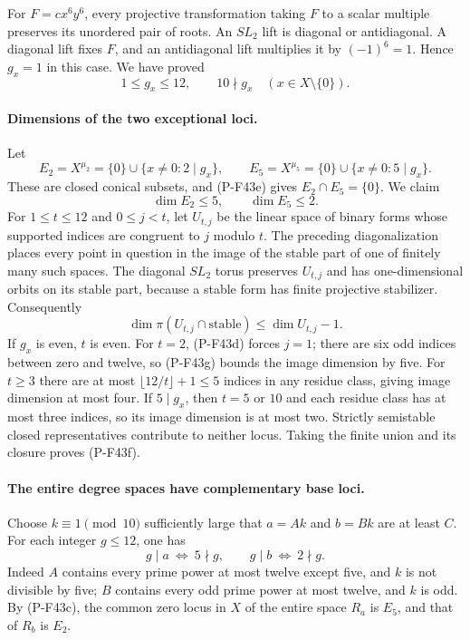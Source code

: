 \documentclass[11pt,a4paper]{article}
\begin{document}
For $F=cx^6y^6$, every projective transformation taking $F$
to a scalar multiple preserves its unordered pair of roots.
An $SL_2$ lift is diagonal or antidiagonal. A diagonal lift
fixes $F$, and an antidiagonal lift multiplies it by
$(-1)^6=1$. Hence $g_x=1$ in this case. We have proved
\[
              1\le g_x\le12,\qquad 10\nmid g_x
                    \quad(x\in X\setminus\{0\}).
 \tag{P-F43e}
\]

\paragraph{Dimensions of the two exceptional loci.}
Let
\[
 E_2=X^{\mu_2}=\{0\}\cup\{x\ne0:2\mid g_x\},
 \qquad
 E_5=X^{\mu_5}=\{0\}\cup\{x\ne0:5\mid g_x\}.
\]
These are closed conical subsets, and (P-F43e) gives
$E_2\cap E_5=\{0\}$. We claim
\[
                       \dim E_2\le5,\qquad\dim E_5\le2.
 \tag{P-F43f}
\]
For $1\le t\le12$ and $0\le j<t$, let $U_{t,j}$ be the
linear space of binary forms whose supported indices are
congruent to $j$ modulo $t$. The preceding diagonalization
places every point in question in the image of the stable
part of one of finitely many such spaces. The diagonal
$SL_2$ torus preserves $U_{t,j}$ and has one-dimensional
orbits on its stable part, because a stable form has finite
projective stabilizer. Consequently
\[
 \dim\pi(U_{t,j}\cap\mathrm{stable})
       \le \dim U_{t,j}-1.
 \tag{P-F43g}
\]
If $g_x$ is even, $t$ is even. For $t=2$, (P-F43d) forces
$j=1$; there are six odd indices between zero and twelve,
so (P-F43g) bounds the image dimension by five. For $t\ge3$
there are at most $\lfloor12/t\rfloor+1\le5$ indices in any
residue class, giving image dimension at most four. If
$5\mid g_x$, then $t=5$ or $10$ and each residue class has
at most three indices, so its image dimension is at most
two. Strictly semistable closed representatives contribute
to neither locus. Taking the finite union and its closure
proves (P-F43f).

\paragraph{The entire degree spaces have complementary base loci.}
Choose $k\equiv1\pmod {10}$ sufficiently large that
$a=Ak$ and $b=Bk$ are at least $C$. For each integer
$g\le12$, one has
\[
 g\mid a\ \Longleftrightarrow\ 5\nmid g,
 \qquad
 g\mid b\ \Longleftrightarrow\ 2\nmid g.
\]
Indeed $A$ contains every prime power at most twelve except
five, and $k$ is not divisible by five; $B$ contains every
odd prime power at most twelve, and $k$ is odd. By
(P-F43c), the common zero locus in $X$ of the entire space
$R_a$ is $E_5$, and that of $R_b$ is $E_2$.
\end{document}
